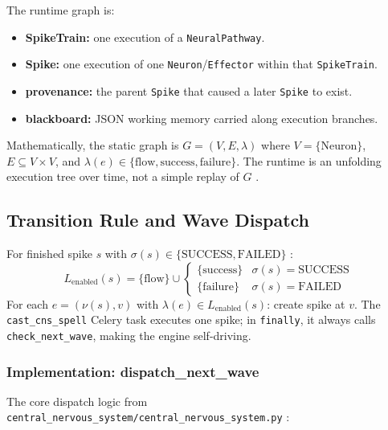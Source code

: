 \documentclass[11pt]{article}
\begin{document}
	The runtime graph is:
	\begin{itemize}
		\item \textbf{SpikeTrain:} one execution of a \texttt{NeuralPathway}.
		\item \textbf{Spike:} one execution of one \texttt{Neuron}/\texttt{Effector} within that \texttt{SpikeTrain}.
		\item \textbf{provenance:} the parent \texttt{Spike} that caused a later \texttt{Spike} to exist.
		\item \textbf{blackboard:} JSON working memory carried along execution branches.
	\end{itemize}

	Mathematically, the static graph is $G = (V, E, \lambda)$ where $V = \{\text{Neuron}\}$, $E \subseteq V \times V$, and $\lambda(e) \in \{\text{flow}, \text{success}, \text{failure}\}$. The runtime is an unfolding execution tree over time, not a simple replay of $G$ \cite{talosCNS,talosLiveCodebase}.

	\subsection{Transition Rule and Wave Dispatch}
	For finished spike $s$ with $\sigma(s) \in \{\text{SUCCESS}, \text{FAILED}\}$ \cite{talosCNS,talosCombined}:
	$$
	L_{\text{enabled}}(s) = \{\text{flow}\} \cup \begin{cases}
	\{\text{success}\} & \sigma(s) = \text{SUCCESS} \\
	\{\text{failure}\} & \sigma(s) = \text{FAILED}
	\end{cases}
	$$
	For each $e = (\nu(s), v)$ with $\lambda(e) \in L_{\text{enabled}}(s)$: create spike at $v$. The \texttt{cast\_cns\_spell} Celery task executes one spike; in \texttt{finally}, it always calls \texttt{check\_next\_wave}, making the engine self-driving.

	\subsubsection{Implementation: dispatch\_next\_wave}
	The core dispatch logic from \texttt{central\_nervous\_system/central\_nervous\_system.py} \cite{talosLiveCodebase}:
\end{document}
